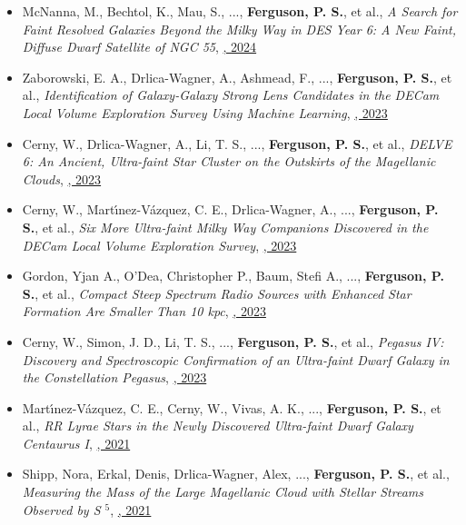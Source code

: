 \begin{itemize}[itemsep=1pt]
    \item {McNanna}, M., {Bechtol}, K., {Mau}, S., ..., \textbf{Ferguson, P. S.}, et al., \textit{{A Search for Faint Resolved Galaxies Beyond the Milky Way in DES Year 6: A New Faint, Diffuse Dwarf Satellite of NGC 55}}, \href{https://ui.adsabs.harvard.edu/abs/2024ApJ...961..126M}{\textbf{\apj}, 2024}
    \item {Zaborowski}, E. A., {Drlica-Wagner}, A., {Ashmead}, F., ..., \textbf{Ferguson, P. S.}, et al., \textit{{Identification of Galaxy-Galaxy Strong Lens Candidates in the DECam Local Volume Exploration Survey Using Machine Learning}}, \href{https://ui.adsabs.harvard.edu/abs/2023ApJ...954...68Z}{\textbf{\apj}, 2023}
    \item {Cerny}, W., {Drlica-Wagner}, A., {Li}, T. S., ..., \textbf{Ferguson, P. S.}, et al., \textit{{DELVE 6: An Ancient, Ultra-faint Star Cluster on the Outskirts of the Magellanic Clouds}}, \href{https://ui.adsabs.harvard.edu/abs/2023ApJ...953L..21C}{\textbf{\apjl}, 2023}
    \item {Cerny}, W., {Mart{\'\i}nez-V{\'a}zquez}, C. E., {Drlica-Wagner}, A., ..., \textbf{Ferguson, P. S.}, et al., \textit{{Six More Ultra-faint Milky Way Companions Discovered in the DECam Local Volume Exploration Survey}}, \href{https://ui.adsabs.harvard.edu/abs/2023ApJ...953....1C}{\textbf{\apj}, 2023}
    \item {Gordon}, Yjan A., {O'Dea}, Christopher P., {Baum}, Stefi A., ..., \textbf{Ferguson, P. S.}, et al., \textit{{Compact Steep Spectrum Radio Sources with Enhanced Star Formation Are Smaller Than 10 kpc}}, \href{https://ui.adsabs.harvard.edu/abs/2023ApJ...948L...9G}{\textbf{\apjl}, 2023}
    \item {Cerny}, W., {Simon}, J. D., {Li}, T. S., ..., \textbf{Ferguson, P. S.}, et al., \textit{{Pegasus IV: Discovery and Spectroscopic Confirmation of an Ultra-faint Dwarf Galaxy in the Constellation Pegasus}}, \href{https://ui.adsabs.harvard.edu/abs/2023ApJ...942..111C}{\textbf{\apj}, 2023}
    \item {Mart{\'\i}nez-V{\'a}zquez}, C. E., {Cerny}, W., {Vivas}, A. K., ..., \textbf{Ferguson, P. S.}, et al., \textit{{RR Lyrae Stars in the Newly Discovered Ultra-faint Dwarf Galaxy Centaurus I}}, \href{https://ui.adsabs.harvard.edu/abs/2021AJ....162..253M}{\textbf{\aj}, 2021}
    \item {Shipp}, Nora, {Erkal}, Denis, {Drlica-Wagner}, Alex, ..., \textbf{Ferguson, P. S.}, et al., \textit{{Measuring the Mass of the Large Magellanic Cloud with Stellar Streams Observed by S $^{5}$}}, \href{https://ui.adsabs.harvard.edu/abs/2021ApJ...923..149S}{\textbf{\apj}, 2021}

\end{itemize}
